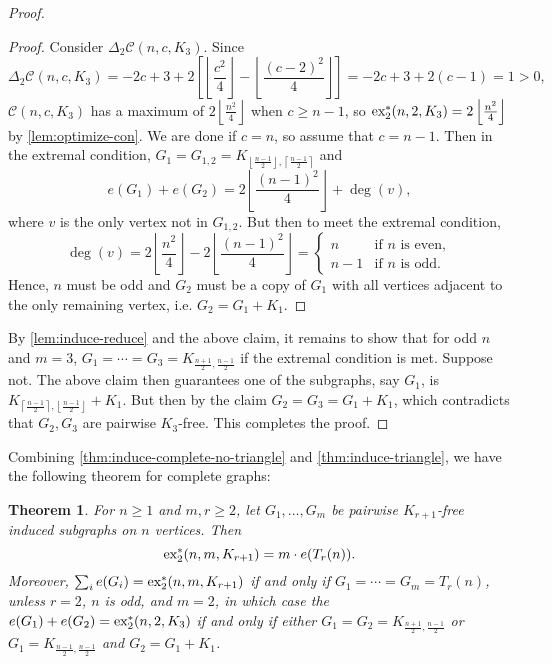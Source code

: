 \documentclass[12pt]{report}
\newtheorem{theorem}{Theorem}[chapter]
\newcommand*{\dex}{\textnormal{ex}_2}
\newcommand*{\con}{\mathcal{C}}
\begin{document}
\begin{proof}
  \begin{proof}
    Consider $\Delta_2 \con(n, c, K_3)$. Since
    \[
      \Delta_2 \con(n, c, K_3) = -2c + 3 + 2\left[\left\lfloor\frac{c^2}{4}\right\rfloor - \left\lfloor\frac{(c - 2)^2}{4}\right\rfloor\right] = -2c + 3 + 2(c - 1) = 1 > 0,
    \]
    $\con(n, c, K_3)$ has a maximum of $2\left\lfloor \frac{n^2}{4} \right\rfloor$ when $c \geq n - 1$, so $\dex^*(n, 2, K_3) = 2\left\lfloor\frac{n^2}{4}\right\rfloor$ by \cref{lem:optimize-con}. We are done if $c = n$, so assume that $c = n - 1$. Then in the extremal condition, $G_1 = G_{1, 2} = K_{\left\lfloor\frac{n - 1}{2}\right\rfloor, \left\lceil\frac{n - 1}{2}\right\rceil}$ and
    \[
      e(G_1) + e(G_2) = 2\left\lfloor\frac{(n - 1)^2}{4}\right\rfloor + \deg(v),
    \]
    where $v$ is the only vertex not in $G_{1, 2}$. But then to meet the extremal condition, 
    \[
      \deg(v) = 2\left\lfloor\frac{n^2}{4}\right\rfloor - 2\left\lfloor\frac{(n - 1)^2}{4}\right\rfloor = \begin{cases}
        n & \text{if $n$ is even}, \\
        n - 1 & \text{if $n$ is odd}.
      \end{cases}
    \]
    Hence, $n$ must be odd and $G_2$ must be a copy of $G_1$ with all vertices adjacent to the only remaining vertex, i.e. $G_2 = G_1 + K_1$.
  \end{proof}
  By \cref{lem:induce-reduce} and the above claim, it remains to show that for odd $n$ and $m = 3$, $G_1 = \cdots = G_3 = K_{\frac{n + 1}{2}, \frac{n - 1}{2}}$ if the extremal condition is met. Suppose not. The above claim then guarantees one of the subgraphs, say $G_1$, is $K_{\left\lceil\frac{n - 1}{2}\right\rceil, \left\lfloor\frac{n - 1}{2}\right\rfloor} + K_1$. But then by the claim $G_2 = G_3 = G_1 + K_1$, which contradicts that $G_2, G_3$ are pairwise $K_3$-free. This completes the proof.
\end{proof}

Combining \cref{thm:induce-complete-no-triangle} and \cref{thm:induce-triangle}, we have the following theorem for complete graphs:

\begin{theorem}\label{thm:induce-complete}
  For $n \geq 1$ and $m, r \geq 2$, let $G_1, \ldots, G_m$ be pairwise $K_{r + 1}$-free induced subgraphs on $n$ vertices. Then
  \[
    \dex^*(n, m, K_{r + 1}) = m \cdot e(T_r(n)).
  \]
  Moreover, $\sum_i e(G_i) = \dex^*(n, m, K_{r + 1})$ if and only if $G_1 = \cdots = G_m = T_r(n)$, unless $r = 2$, $n$ is odd, and $m = 2$, in which case the $e(G_1) + e(G_2) = \dex^*(n, 2, K_3)$ if and only if either $G_1 = G_2 = K_{\frac{n + 1}{2}, \frac{n - 1}{2}}$ or $G_{1} = K_{\frac{n - 1}{2}, \frac{n - 1}{2}}$ and $G_{2} = G_1+ K_1$.
\end{theorem}
\end{document}
